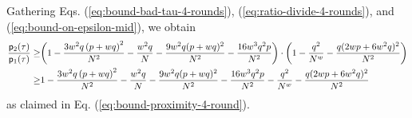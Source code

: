 %



Gathering Eqs. (\ref{eq:bound-bad-tau-4-rounds}), (\ref{eq:ratio-divide-4-rounds}), and (\ref{eq:bound-on-epsilon-mid}), we obtain
%
\begin{align*}
\frac{\mathsf{p}_{2}(\tau)}{\mathsf{p}_{1}(\tau)}   \geq   & \bigg(1-\frac{3w^{2} q \left(p+w q\right)^{2}}{N^{2}} - \frac{w^{2} q}{N} - \frac{9w^2 q (p+w q)^{2}}{N^2}- \frac{16w^3q^2p}{N^2}\bigg)\cdot\bigg(1-\frac{q^2}{N^w}-\frac{q(2wp+6w^2q)^2}{N^2}\bigg)     \notag      \\
\geq  &  1-\frac{3w^{2} q \left(p+w q\right)^{2}}{N^{2}} - \frac{w^{2} q}{N} - \frac{9w^2 q (p+w q)^{2}}{N^2}- \frac{16w^3q^2p}{N^2}-\frac{q^2}{N^w}-\frac{q(2wp+6w^2q)^2}{N^2}     \notag   
\end{align*}
%
as claimed in Eq. (\ref{eq:bound-proximity-4-round}).
